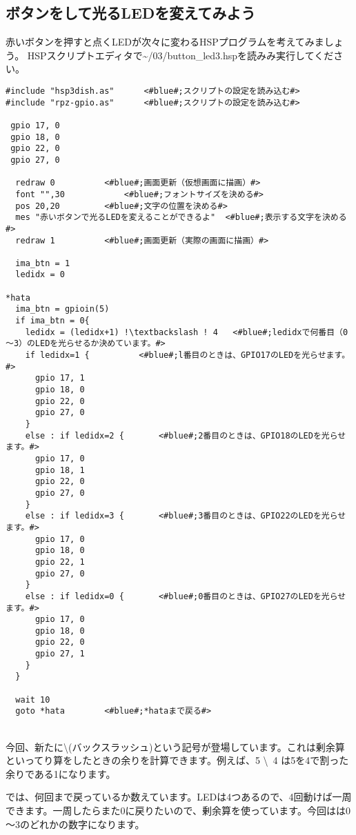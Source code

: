 \subsection{ボタンをして光るLEDを変えてみよう}
赤いボタンを押すと点くLEDが次々に変わるHSPプログラムを考えてみましょう。
HSPスクリプトエディタで\textasciitilde /03/button\_led3.hspを読みみ実行してください。

\begin{lstlisting}[escapechar=!,caption=button\_led3.hsp,label=button_led3.hsp]
#include "hsp3dish.as"		<#blue#;スクリプトの設定を読み込む#>
#include "rpz-gpio.as"		<#blue#;スクリプトの設定を読み込む#>

 gpio 17, 0
 gpio 18, 0
 gpio 22, 0
 gpio 27, 0
	
  redraw 0			<#blue#;画面更新（仮想画面に描画）#>
  font "",30			<#blue#;フォントサイズを決める#>
  pos 20,20			<#blue#;文字の位置を決める#>
  mes "赤いボタンで光るLEDを変えることができるよ"	<#blue#;表示する文字を決める#>
  redraw 1			<#blue#;画面更新（実際の画面に描画）#>

  ima_btn = 1
  ledidx = 0

*hata
  ima_btn = gpioin(5)
  if ima_btn = 0{
    ledidx = (ledidx+1) !\textbackslash ! 4	  <#blue#;ledidxで何番目（0～3）のLEDを光らせるか決めています。#>
    if ledidx=1 {		   <#blue#;l番目のときは、GPIO17のLEDを光らせます。#>
      gpio 17, 1
      gpio 18, 0
      gpio 22, 0
      gpio 27, 0
    }
    else : if ledidx=2 {	   <#blue#;2番目のときは、GPIO18のLEDを光らせます。#>
      gpio 17, 0
      gpio 18, 1
      gpio 22, 0
      gpio 27, 0
    }
    else : if ledidx=3 {	   <#blue#;3番目のときは、GPIO22のLEDを光らせます。#>
      gpio 17, 0
      gpio 18, 0
      gpio 22, 1
      gpio 27, 0
    }
    else : if ledidx=0 {	   <#blue#;0番目のときは、GPIO27のLEDを光らせます。#>
      gpio 17, 0
      gpio 18, 0
      gpio 22, 0
      gpio 27, 1
    }
  }

  wait 10
  goto *hata		<#blue#;*hataまで戻る#>
\end{lstlisting}

\textbf{}\\
今回、新たに\textbackslash (バックスラッシュ)という記号が登場しています。これは剰余算といってり算をしたときの余りを計算できます。例えば、5 \textbackslash \ 4 は5を4で割った余りである1になります。

では、何回まで戻っているか数えています。LEDは4つあるので、4回動けば一周できます。一周したらまた0に戻りたいので、剰余算を使っています。今回はは0～3のどれかの数字になります。\\


